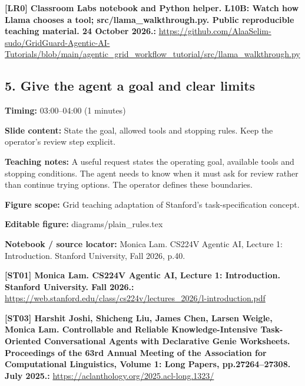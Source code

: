 \documentclass[10pt,letterpaper]{article}
\begin{document}
\textbf{[LR0] Classroom Labs notebook and Python helper. L10B: Watch how Llama chooses a tool; src/llama\_walkthrough.py. Public reproducible teaching material. 24 October 2026.:} \href{https://github.com/AlaaSelim-sudo/GridGuard-Agentic-AI-Tutorials/blob/main/agentic_grid_workflow_tutorial/src/llama_walkthrough.py}{\small\ttfamily https:/\allowbreak{}/\allowbreak{}github.\allowbreak{}com/\allowbreak{}AlaaSelim-\allowbreak{}sudo/\allowbreak{}GridGuard-\allowbreak{}Agentic-\allowbreak{}AI-\allowbreak{}Tutorials/\allowbreak{}blob/\allowbreak{}main/\allowbreak{}agentic\_\allowbreak{}grid\_\allowbreak{}workflow\_\allowbreak{}tutorial/\allowbreak{}src/\allowbreak{}llama\_\allowbreak{}walkthrough.\allowbreak{}py}\par
\par\medskip
\subsection*{5. Give the agent a goal and clear limits}
\textbf{Timing:} 03:00--04:00 (1 minutes)\par
\textbf{Slide content:} State the goal, allowed tools and stopping rules.
Keep the operator's review step explicit.\par
\textbf{Teaching notes:} A useful request states the operating goal, available tools and stopping conditions. The agent needs to know when it must ask for review rather than continue trying options. The operator defines these boundaries.\par
\textbf{Figure scope:} Grid teaching adaptation of Stanford's task-specification concept.\par
\textbf{Editable figure:} diagrams/plain\_rules.tex\par
\textbf{Notebook / source locator:} Monica Lam. CS224V Agentic AI, Lecture 1: Introduction. Stanford University, Fall 2026, p.40.\par
\textbf{[ST01] Monica Lam. CS224V Agentic AI, Lecture 1: Introduction. Stanford University. Fall 2026.:} \href{https://web.stanford.edu/class/cs224v/lectures_2026/l-introduction.pdf}{\small\ttfamily https:/\allowbreak{}/\allowbreak{}web.\allowbreak{}stanford.\allowbreak{}edu/\allowbreak{}class/\allowbreak{}cs224v/\allowbreak{}lectures\_\allowbreak{}2026/\allowbreak{}l-\allowbreak{}introduction.\allowbreak{}pdf}\par
\textbf{[ST03] Harshit Joshi, Shicheng Liu, James Chen, Larsen Weigle, Monica Lam. Controllable and Reliable Knowledge-Intensive Task-Oriented Conversational Agents with Declarative Genie Worksheets. Proceedings of the 63rd Annual Meeting of the Association for Computational Linguistics, Volume 1: Long Papers, pp.27264--27308. July 2025.:} \href{https://aclanthology.org/2025.acl-long.1323/}{\small\ttfamily https:/\allowbreak{}/\allowbreak{}aclanthology.\allowbreak{}org/\allowbreak{}2025.\allowbreak{}acl-\allowbreak{}long.\allowbreak{}1323/\allowbreak{}}\par
\end{document}
